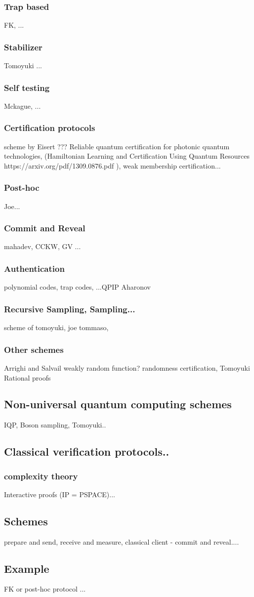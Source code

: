 \subsubsection{Trap based}
 FK, ...
\subsubsection{Stabilizer}
Tomoyuki ...
\subsubsection{Self testing}
Mckague, ...
\subsubsection{Certification protocols}
scheme by Eisert ??? Reliable quantum certification for photonic quantum technologies, (Hamiltonian Learning and Certification Using Quantum Resources https://arxiv.org/pdf/1309.0876.pdf ), weak membership certification...
\subsubsection{Post-hoc}
Joe...
\subsubsection{Commit and Reveal}
mahadev, CCKW, GV ...
\subsubsection{Authentication}
polynomial codes, trap codes, ...QPIP Aharonov
\subsubsection{Recursive Sampling, Sampling...}
scheme of tomoyuki, joe tommaso, 

\subsubsection{Other schemes}
Arrighi and Salvail weakly random function? randomness certification, Tomoyuki Rational proofs


\subsection{Non-universal quantum computing schemes }
IQP, Boson sampling, Tomoyuki..
\subsection{Classical verification protocols..}

\subsubsection{complexity theory} 
Interactive proofs (IP = PSPACE)...

\subsection{Schemes}
prepare and send, receive and measure, classical client - commit and reveal.... 

\subsection{Example}
FK or post-hoc protocol ... 
